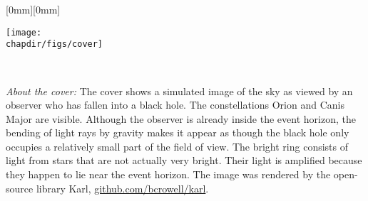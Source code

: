 \begin{titlepages}
%
\thispagestyle{empty}
\raisebox{0mm}[0mm][0mm]{%
\parbox{8.5in}{
\vspace*{236mm}\hspace{-38.5mm}\texttt{[image: \\chapdir/figs/cover]}\\
}
}%
\\


\end{titlepages}

\begin{titlepages}[2]
  \brieftitle
\end{titlepages}

\begin{titlepages}
  \vspace{100mm}
  \noindent\emph{About the cover:} The cover shows a simulated image of the sky as viewed by an observer who has fallen into a black hole.
  The constellations Orion and Canis Major are visible. Although the observer is already inside the event horizon, the bending
  of light rays by gravity makes it appear as though the black hole only occupies a relatively small part of the field of view.
  The bright ring consists of light from
  stars that are not actually very bright. Their light is amplified because they happen to lie near the event horizon.
  The image was rendered by the open-source library Karl, \url{github.com/bcrowell/karl}. 
  \vfill
\end{titlepages}

\normalsize\normalfont\pagebreak\thispagestyle{empty}\cleardoublepage\thispagestyle{empty}
